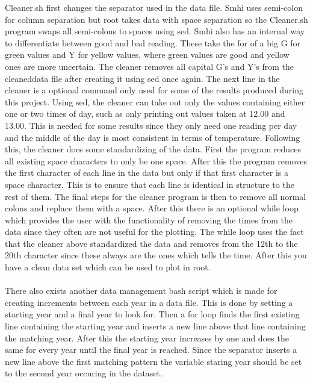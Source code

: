 \documentclass{article}
\begin{document}
Cleaner.sh first changes the separator used in the data file. Smhi uses semi-colon for column separation but root takes data with space separation so the Cleaner.sh program swaps all semi-colons to spaces using sed. Smhi also has an internal way to differentiate between good and bad reading. These take the for of a big G for green values and Y for yellow values, where green values are good and yellow ones are more uncertain. The cleaner removes all capital G's and Y's from the cleaneddata file after creating it using sed once again. The next line in the cleaner is a optional command only used for some of the results produced during this project. Using sed, the cleaner can take out only the values containing either one or two times of day, such as only printing out values taken at 12.00 and 13.00. This is needed for some results since they only need one reading per day and the middle of the day is most consistent in terms of temperature. Following this, the cleaner does some standardizing of the data. First the program reduces all existing space characters to only be one space. After this the program removes the first character of each line in the data but only if that first character is a space character. This is to ensure that each line is identical in structure to the rest of them. The final steps for the cleaner program is then to remove all normal colons and replace them with a space. After this there is an optional while loop which provides the user with the functionality of removing the times from the data since they often are not useful for the plotting. The while loop uses the fact that the cleaner above standardized the data and removes from the 12th to the 20th character since these always are the ones which tells the time. After this you have a clean data set which can be used to plot in root.\\\\
There also exists another data management bash script which is made for creating increments between each year in a data file. This is done by setting a starting year and a final year to look for. Then a for loop finds the first existing line containing the starting year and inserts a new line above that line containing the matching year. After this the starting year increases by one and does the same for every year until the final year is reached. Since the separator inserts a new line above the first matching pattern the variable staring year should be set to the second year occuring in the dataset. 
\end{document}
